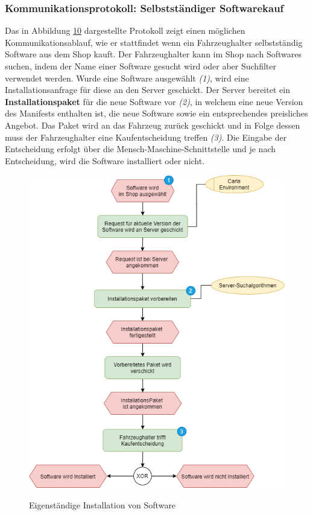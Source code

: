 \subsubsection{Kommunikationsprotokoll: Selbstständiger Softwarekauf}
Das in Abbildung \hyperref[img:eigenstaendigIns]{10} dargestellte Protokoll zeigt einen möglichen Kommunikationsablauf, wie er stattfindet wenn ein Fahrzeughalter selbstständig Software aus dem Shop kauft. Der Fahrzeughalter kann im Shop nach Softwares suchen, indem der Name einer Software gesucht wird oder aber Suchfilter verwendet werden. Wurde eine Software ausgewählt \textit{(1)}, wird eine Installationsanfrage für diese an den Server geschickt. Der Server bereitet ein \textbf{Installationspaket} für die neue Software vor \textit{(2)}, in welchem eine neue Version des Manifests enthalten ist, die neue Software sowie ein entsprechendes preisliches Angebot. Das Paket wird an das Fahrzeug zurück geschickt und in Folge dessen muss der Fahrzeughalter eine Kaufentscheidung treffen \textit{(3)}. Die Eingabe der Entscheidung erfolgt über die Mensch-Maschine-Schnittstelle und je nach Entscheidung, wird die Software installiert oder nicht.\\
\begin{figure}[H]
	\centering
	\vspace{-0.6cm}
	\includegraphics[width=0.8\columnwidth]{pictures/konzept-Eigene-Installation.png}
	\label{img:eigenstaendigIns}
	\caption{Eigenständige Installation von Software}
\end{figure}
